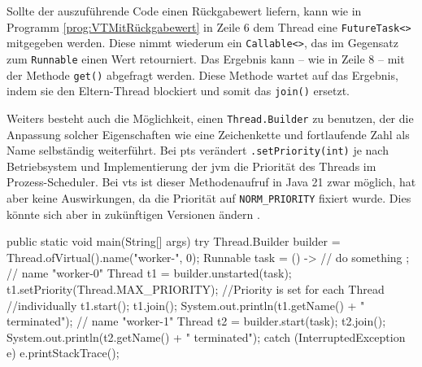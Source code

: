     \begin{program} [H]
        \caption{\Glspl{vt} mit Rückgabewert}
        \label{prog:VTMitRückgabewert}
    \begin{JavaCode}[language=Java, numbers=left]
public static void main(String[] args) {
    FutureTask<String> futureTask = new FutureTask<>(() -> {
        Thread.sleep(1000);
        return "Task completed";
    });
    Thread.ofVirtual().start(futureTask);
    try {
        System.out.println(STR."Result: \{futureTask.get()}");
    } catch (Exception e) {
        e.printStackTrace();
    }
}\end{JavaCode}
    \end{program}
    Sollte der auszuführende Code einen Rückgabewert liefern, kann wie in Programm \ref{prog:VTMitRückgabewert} in Zeile 6 dem Thread eine \texttt{FutureTask<>} mitgegeben werden. Diese nimmt wiederum
    ein \texttt{Callable<>}, das im Gegensatz zum \texttt{Runnable} einen Wert retourniert. Das Ergebnis kann -- wie in Zeile 8 -- mit der Methode \texttt{get()} abgefragt werden.
    Diese Methode wartet auf das Ergebnis, indem sie den Eltern-Thread blockiert und somit das \texttt{join()} ersetzt.



    Weiters besteht auch die Möglichkeit, einen \texttt{Thread.Builder} zu benutzen, der die Anpassung solcher Eigenschaften wie eine Zeichenkette und fortlaufende Zahl
    als Name selbständig weiterführt.
    Bei \Glspl{pt} verändert \texttt{.setPriority(int)} je nach Betriebsystem und Implementierung der \gls{jvm} die Priorität des Threads im Prozess-Scheduler. Bei \Glspl{vt} ist dieser Methodenaufruf in Java 21 zwar
    möglich, hat aber keine Auswirkungen, da die Priorität auf \texttt{NORM\_PRIORITY} fixiert wurde. Dies könnte sich aber in zukünftigen Versionen ändern \cite{JEP444}.

    
    
    \begin{program} [H]
        \caption{Beispiel eines \texttt{Thread.Builder} für \Glspl{vt} in Java}
        \label{prog:ErstellungEinesVTBuilders}
    \begin{JavaCode}[language=Java, numbers=left]
public static void main(String[] args) {
    try {
        Thread.Builder builder = Thread.ofVirtual().name("worker-", 0);
        Runnable task = () -> {
            // do something
        };
        // name "worker-0"
        Thread t1 = builder.unstarted(task);
        t1.setPriority(Thread.MAX_PRIORITY);    //Priority is set for each Thread 
                                                //individually   
        t1.start(); t1.join();
        System.out.println(t1.getName() + " terminated");
        // name "worker-1"
        Thread t2 = builder.start(task);   
        t2.join();  
        System.out.println(t2.getName() + " terminated");
    } catch (InterruptedException e) {
        e.printStackTrace();
    }
}\end{JavaCode}
    \end{program}

